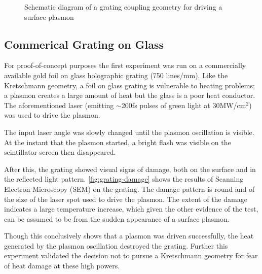 \begin{figure}
  \centering
  
  \caption{Schematic diagram of a grating coupling geometry for driving a surface plasmon}
  \label{fig:plasmon_schematic}
\end{figure}

\subsection{Commerical Grating on Glass}

For proof-of-concept purposes the first experiment was run on a commercially available gold foil on glass holographic grating (750 lines/mm).
Like the Kretschmann geometry, a foil on glass grating is vulnerable to heating problems; a plasmon creates a large amount of heat but the glass is a poor heat conductor.
The aforementioned laser (emitting $\sim$200fs pulses of green light at 30MW/cm$^2$) was used to drive the plasmon.

The input laser angle was slowly changed until the plasmon oscillation is visible.
At the instant that the plasmon started, a bright flash was visible on the scintillator screen then disappeared.

After this, the grating showed visual signs of damage, both on the surface and in the reflected light pattern.
\ref{fig:grating-damage} shows the results of Scanning Electron Microscopy (SEM) on the grating.
The damage pattern is round and of the size of the laser spot used to drive the plasmon.
The extent of the damage indicates a large temperature increase, which given the other evidence of the test, can be assumed to be from the sudden appearance of a surface plasmon.

Though this conclusively shows that a plasmon was driven successfully, the heat generated by the plasmon oscillation destroyed the grating.
Further this experiment validated the decision not to pursue a Kretschmann geometry for fear of heat damage at these high powers.


